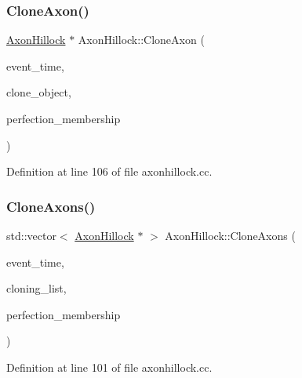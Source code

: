 \subsubsection{\texorpdfstring{Clone\+Axon()}{CloneAxon()}}
{\footnotesize\ttfamily \mbox{\hyperlink{class_axon_hillock}{Axon\+Hillock}} $\ast$ Axon\+Hillock\+::\+Clone\+Axon (\begin{DoxyParamCaption}\item[{std\+::chrono\+::time\+\_\+point$<$ \mbox{\hyperlink{universe_8h_a0ef8d951d1ca5ab3cfaf7ab4c7a6fd80}{Clock}} $>$}]{event\+\_\+time,  }\item[{\mbox{\hyperlink{class_axon_hillock}{Axon\+Hillock}} $\ast$}]{clone\+\_\+object,  }\item[{double}]{perfection\+\_\+membership }\end{DoxyParamCaption})}



Definition at line 106 of file axonhillock.\+cc.

\mbox{\label{class_axon_hillock_aa65cead56b10bda66dc256c68764a553}} 
\subsubsection{\texorpdfstring{Clone\+Axons()}{CloneAxons()}}
{\footnotesize\ttfamily std\+::vector$<$ \mbox{\hyperlink{class_axon_hillock}{Axon\+Hillock}} $\ast$ $>$ Axon\+Hillock\+::\+Clone\+Axons (\begin{DoxyParamCaption}\item[{std\+::chrono\+::time\+\_\+point$<$ \mbox{\hyperlink{universe_8h_a0ef8d951d1ca5ab3cfaf7ab4c7a6fd80}{Clock}} $>$}]{event\+\_\+time,  }\item[{std\+::vector$<$ \mbox{\hyperlink{class_axon_hillock}{Axon\+Hillock}} $\ast$$>$}]{cloning\+\_\+list,  }\item[{double}]{perfection\+\_\+membership }\end{DoxyParamCaption})}



Definition at line 101 of file axonhillock.\+cc.

\mbox{\label{class_axon_hillock_ae6b18ec6f2921b9d4461b89a9d72ab25}} 
